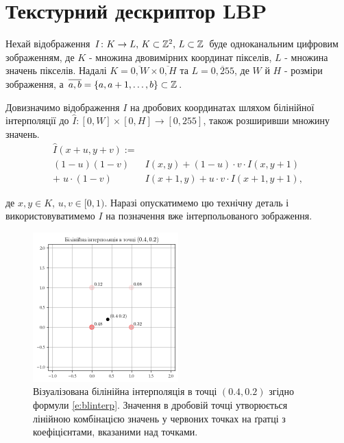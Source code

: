 \section{Текстурний дескриптор LBP}\label{section1.lbp}

Нехай відображення \(I \colon K \to L$, $K \subset \Z^2$, $L \subset \Z\) 
буде одноканальним цифровим зображенням, 
де $K$ - множина двовимірних координат пікселів, $L$ - множина значень пікселів.
Надалі $K = \overline{0,W} \times \overline{0,H}$ та $L = \overline{0,255}$, 
де $W$ й $H$ - розміри зображення, а $\overline{a,b} = \{a, a+1, \dots , b\} \subset \mathbb Z$.

Довизначимо відображення $I$ на дробових координатах шляхом білінійної інтерполяції до $\hat I \colon [0,W] \times [0,H] \to [0,255]$, також розширивши множину значень.
\begin{equation}
\begin{split}\label{e:blinterp}
    \hat I(x+u,y+v) := \\
    (1 - u)(1 - v) & I(x,y) + (1-u) \cdot v \cdot I(x,y+1)\\ 
    + \; u \cdot (1-v) & I(x+1,y) + u \cdot v \cdot  I(x+1,y+1),
\end{split}
\end{equation}

де $x,y \in K$, $u,v \in [0,1)$. 
Наразі опускатимемо цю технічну деталь і використовуватимемо $I$ на позначення вже інтерпольованого зображення.

\begin{figure}[h]
    \centering
    \includegraphics[width=0.5\textwidth]{img/bilinear-interpolation-1.png}
    \caption{
        Візуалізована білінійна інтерполяція в точці $(0.4,0.2)$ згідно формули \ref{e:blinterp}. 
        Значення в дробовій точці утворюється лінійною комбінацією значень у червоних точках на ґратці
        з коефіцієнтами, вказаними над точками.
    }
    \label{fig:bilinear-interp}
\end{figure}

